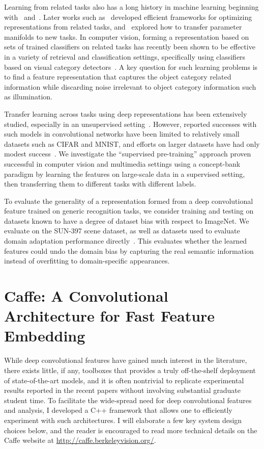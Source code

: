 Learning from related tasks also has a long history in machine learning beginning with~\cite{caruana1997multitask} and~\cite{thrun1996learning}. Later works such as~\cite{argyriou2008convex} developed efficient frameworks for optimizing representations from related tasks, and~\cite{ando2005framework} explored how to transfer parameter manifolds to new tasks. In computer vision, forming a representation based on sets of trained classifiers on related tasks has recently been shown to be effective in a variety of retrieval and classification settings, specifically using classifiers based on visual category detectors~\cite{torresani2010efficient,li2010object}. A key question for such learning problems is to find a feature representation that captures the object category related information while discarding noise irrelevant to object category information such as illumination.

Transfer  learning across tasks using deep representations has been extensively studied, especially in an unsupervised setting~\cite{raina2007self,mesnil2012unsupervised}. However, reported successes with such models in convolutional networks have been limited to relatively small datasets such as CIFAR and MNIST, and efforts on larger datasets have had only modest success~\cite{googlebrain}.  We investigate the ``supervised pre-training'' approach proven successful in computer vision and multimedia settings using a concept-bank paradigm \cite{lscom,li2010object,torresani2010efficient} by learning the features on large-scale data in a supervised setting, then transferring them to different tasks with different labels.

To evaluate the generality of a representation formed from a deep convolutional feature trained on generic recognition tasks, we consider training and testing on datasets known to have a degree of dataset bias with respect to ImageNet. We evaluate on the SUN-397 scene dataset, as well as datasets used to evaluate domain adaptation performance directly~\cite{ref:dlid,ref:kulis_cvpr11}. This evaluates whether the learned features could undo the domain bias by capturing the real semantic information instead of overfitting to domain-specific appearances.

\section{Caffe: A Convolutional Architecture for Fast Feature Embedding}
While deep convolutional features have gained much interest in the literature, there exists little, if any, toolboxes that provides a truly off-the-shelf deployment of state-of-the-art models, and it is often nontrivial to replicate experimental results reported in the recent papers without involving substantial graduate student time. To facilitate the wide-spread need for deep convolutional features and analysis, I developed a C++ framework that allows one to efficiently experiment with such architectures. I will elaborate a few key system design choices below, and the reader is encouraged to read more technical details on the Caffe website at \url{http://caffe.berkeleyvision.org/}.

